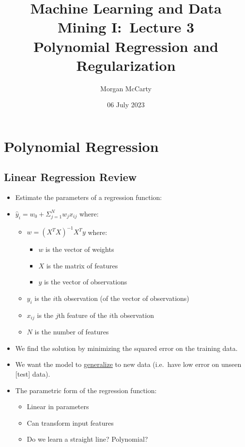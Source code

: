 \documentclass[12pt]{article}
\title{
    Machine Learning and Data Mining I:\ Lecture 3\\
    Polynomial Regression and Regularization}
\author{Morgan McCarty}
\date{06 July 2023}
\begin{document}
    \maketitle

    \section{Polynomial Regression}
        \subsection{Linear Regression Review}
            \begin{itemize}
                \item Estimate the parameters of a regression function:
                \item $\hat{y}_i = w_0 + \Sigma_{j=1}^N {w_j}x_{ij}$ where:
                \begin{itemize}
                    \item $w = {({X^T}X)}^{-1}{X^T}y$ where:
                    \begin{itemize}
                        \item $w$ is the vector of weights
                        \item $X$ is the matrix of features
                        \item $y$ is the vector of observations
                    \end{itemize}
                    \item $y_i$ is the $i$th observation (of the vector of observations)
                    \item $x_{ij}$ is the $j$th feature of the $i$th observation
                    \item $N$ is the number of features
                \end{itemize}
                \item We find the solution by minimizing the squared error on the training data.
                \item We want the model to \underline{generalize} to new data (i.e.\ have low error on unseen [test] data).
                \item The parametric form of the regression function:
                \begin{itemize}
                    \item Linear in parameters
                    \item Can transform input features
                    \item Do we learn a straight line? Polynomial?
                \end{itemize}
            \end{itemize}
\end{document}
